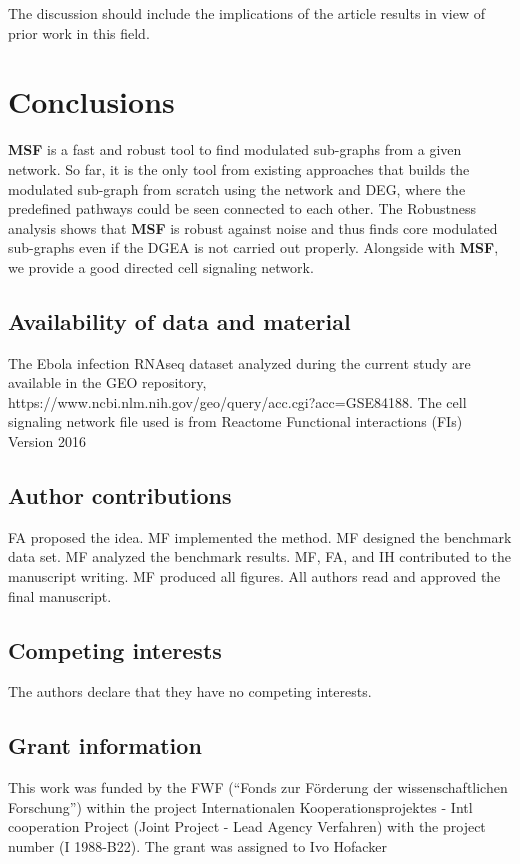 \documentclass[twocolumn]{article}
\begin{document}
The discussion should include the implications of the article results
in view of prior work in this field.

\section*{Conclusions}

\textbf{MSF} is a fast and robust tool to find modulated sub-graphs from a given network. So far, it is the only tool from existing approaches that builds the modulated sub-graph from scratch using the network and DEG, where the predefined pathways could be seen connected to each other. The Robustness analysis shows that \textbf{MSF} is robust against noise and thus finds core modulated sub-graphs even if the DGEA is not carried out properly. Alongside with \textbf{MSF}, we provide a good directed cell signaling network.

\subsection*{Availability of data and material}

The Ebola infection RNAseq dataset analyzed during the current study are
available in the GEO repository, {\scriptsize
  https://www.ncbi.nlm.nih.gov/geo/query/acc.cgi?acc=GSE84188.}  The cell signaling
network file used is from Reactome Functional interactions (FIs)
Version 2016


\subsection*{Author contributions}
FA proposed the idea. MF implemented the method. MF designed the benchmark
data set. MF analyzed the benchmark results. MF, FA, and IH contributed to
the manuscript writing. MF produced all figures. All authors read and
approved the final manuscript.

\subsection*{Competing interests}

The authors declare that they have no competing interests.


\subsection*{Grant information}

This work was funded by the FWF (“Fonds zur Förderung der wissenschaftlichen Forschung”) within the project Internationalen Kooperationsprojektes - Intl cooperation Project (Joint Project - Lead Agency Verfahren) with the project number (I 1988-B22). The grant was assigned to Ivo Hofacker
\end{document}
